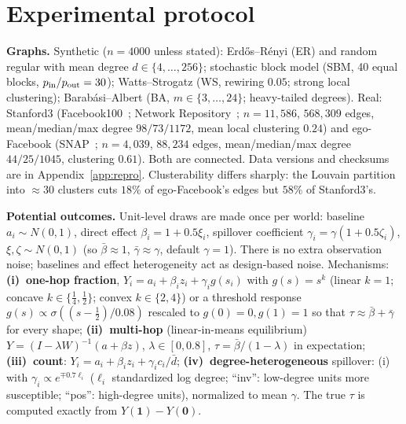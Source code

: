 \section{Experimental protocol}
\label{sec:protocol}

\textbf{Graphs.} Synthetic ($n=4000$ unless stated): Erd\H{o}s--R\'enyi (ER) and random regular with mean degree $d\in\{4,\dots,256\}$; stochastic block model (SBM, 40 equal blocks, $p_{\rm in}/p_{\rm out}=30$); Watts--Strogatz (WS, rewiring $0.05$; strong local clustering); Barab\'asi--Albert (BA, $m\in\{3,\dots,24\}$; heavy-tailed degrees). Real: Stanford3 (Facebook100~\citep{traud2012social}; Network Repository~\citep{rossi2015network}; $n=11{,}586$, $568{,}309$ edges, mean/median/max degree $98/73/1172$, mean local clustering $0.24$) and ego-Facebook (SNAP~\citep{mcauley2012learning}; $n=4{,}039$, $88{,}234$ edges, mean/median/max degree $44/25/1045$, clustering $0.61$). Both are connected. Data versions and checksums are in Appendix~\ref{app:repro}. Clusterability differs sharply: the Louvain partition into $\approx30$ clusters cuts $18\%$ of ego-Facebook's edges but $58\%$ of Stanford3's.

\textbf{Potential outcomes.} Unit-level draws are made once per world: baseline $a_i\sim N(0,1)$, direct effect $\beta_i=1+0.5\xi_i$, spillover coefficient $\gamma_i=\gamma(1+0.5\zeta_i)$, $\xi,\zeta\sim N(0,1)$ (so $\bar\beta\approx1$, $\bar\gamma\approx\gamma$, default $\gamma=1$). There is no extra observation noise; baselines and effect heterogeneity act as design-based noise. Mechanisms:
\textbf{(i)~one-hop fraction}, $Y_i=a_i+\beta_iz_i+\gamma_ig(s_i)$ with $g(s)=s^k$ (linear $k=1$; concave $k\in\{\frac14,\frac12\}$; convex $k\in\{2,4\}$) or a threshold response $g(s)\propto\sigma((s-\frac12)/0.08)$ rescaled to $g(0)=0,g(1)=1$ so that $\tau\approx\bar\beta+\bar\gamma$ for every shape; \textbf{(ii)~multi-hop} (linear-in-means equilibrium) $Y=(I-\lambda W)^{-1}(a+\beta z)$, $\lambda\in[0,0.8]$, $\tau=\bar\beta/(1-\lambda)$ in expectation; \textbf{(iii)~count}: $Y_i=a_i+\beta_iz_i+\gamma_ic_i/\bar d$; \textbf{(iv)~degree-heterogeneous} spillover: (i) with $\gamma_i\propto e^{\mp0.7\ell_i}$ ($\ell_i$ standardized log degree; ``inv'': low-degree units more susceptible; ``pos'': high-degree units), normalized to mean $\gamma$. The true $\tau$ is computed exactly from $Y(\mathbf1)-Y(\mathbf0)$.

